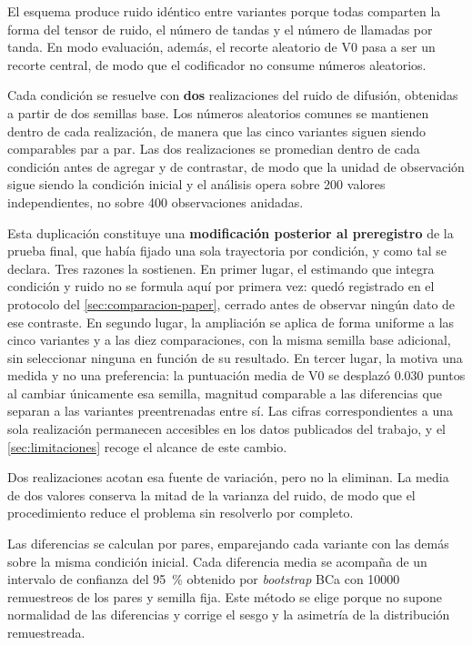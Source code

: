 El esquema produce ruido id\'entico entre variantes porque todas comparten la forma del
tensor de ruido, el n\'umero de tandas y el n\'umero de llamadas por tanda. En modo
evaluaci\'on, adem\'as, el recorte aleatorio de V0 pasa a ser un recorte central, de modo
que el codificador no consume n\'umeros aleatorios.

Cada condici\'on se resuelve con \textbf{dos} realizaciones del ruido de difusi\'on,
obtenidas a partir de dos semillas base. Los n\'umeros aleatorios comunes se mantienen
dentro de cada realizaci\'on, de manera que las cinco variantes siguen siendo comparables
par a par. Las dos realizaciones se promedian dentro de cada condici\'on antes de agregar y
de contrastar, de modo que la unidad de observaci\'on sigue siendo la condici\'on inicial y
el an\'alisis opera sobre \num{200} valores independientes, no sobre \num{400}
observaciones anidadas.

Esta duplicaci\'on constituye una \textbf{modificaci\'on posterior al preregistro} de la
prueba final, que hab\'ia fijado una sola trayectoria por condici\'on, y como tal se
declara. Tres razones la sostienen. En primer lugar, el estimando que integra condici\'on y
ruido no se formula aqu\'i por primera vez: qued\'o registrado en el protocolo del
\cref{sec:comparacion-paper}, cerrado antes de observar ning\'un dato de ese contraste. En
segundo lugar, la ampliaci\'on se aplica de forma uniforme a las cinco variantes y a las
diez comparaciones, con la misma semilla base adicional, sin seleccionar ninguna en
funci\'on de su resultado. En tercer lugar, la motiva una medida y no una preferencia: la
puntuaci\'on media de V0 se desplaz\'o \num{0.030} puntos al cambiar \'unicamente esa
semilla, magnitud comparable a las diferencias que separan a las variantes preentrenadas
entre s\'i. Las cifras correspondientes a una sola realizaci\'on permanecen accesibles en
los datos publicados del trabajo, y el \cref{sec:limitaciones} recoge el alcance de este
cambio.

Dos realizaciones acotan esa fuente de variaci\'on, pero no la eliminan. La media de dos
valores conserva la mitad de la varianza del ruido, de modo que el procedimiento reduce el
problema sin resolverlo por completo.


Las diferencias se calculan por pares, emparejando cada variante con las dem\'as sobre la
misma condici\'on inicial. Cada diferencia media se acompa\~na de un intervalo de confianza
del \SI{95}{\percent} obtenido por \textit{bootstrap} BCa con \num{10000} remuestreos de
los pares y semilla fija. Este m\'etodo se elige porque no supone normalidad de las
diferencias y corrige el sesgo y la asimetr\'ia de la distribuci\'on remuestreada.

